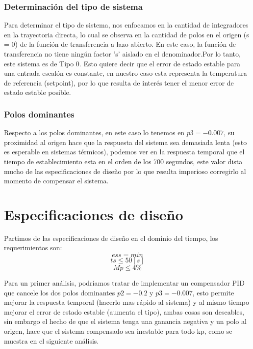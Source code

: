 \documentclass[12pt]{article}
\begin{document}
	\subsubsection{Determinación del tipo de sistema}
	Para determinar el tipo de sistema, nos enfocamos en la cantidad de integradores en la trayectoria directa, lo cual se observa en la cantidad de polos en el origen (s = 0) de la función de transferencia a lazo abierto.	En este caso, la función de transferencia no tiene ningún factor 's' aislado en el denominador.Por lo tanto, este sistema es de Tipo 0. Esto quiere decir que el error de estado estable para una entrada escalón es constante, en nuestro caso esta representa la temperatura de referencia (setpoint), por lo que resulta de interés tener el menor error de estado estable posible.

	\subsubsection{Polos dominantes}
	Respecto a los polos dominantes, en este caso lo tenemos en $p3=-0.007$, su proximidad al origen hace que la respuesta del sistema sea demasiada lenta (esto es esperable en sistemas térmicos), podemos ver en la respuesta temporal que el tiempo de establecimiento esta en el orden de los 700 segundos, este valor dista mucho de las especificaciones de diseño por lo que resulta imperioso corregirlo al momento de compensar el sistema.\newpage
	
\section{Especificaciones de diseño}
	Partimos de las especificaciones de diseño en el dominio del tiempo, los requerimientos son:
	\begin{equation}
		ess=min
	\end{equation}
	\begin{equation}
		ts\leq 50[s]
	\end{equation}
	\begin{equation}
		Mp\leq 4 \%
	\end{equation}
	
	Para un primer análisis, podríamos tratar de implementar un compensador PID que cancele los dos polos dominantes $p2=-0.2$ y $p3=-0.007$, esto permite mejorar la respuesta temporal (hacerlo mas rápido al sistema) y al mismo tiempo mejorar el error de estado estable (aumenta el tipo), ambas cosas son deseables, sin embargo el hecho de que el sistema tenga una ganancia negativa y un polo al origen, hace que el sistema compensado sea inestable para todo kp, como se muestra en el siguiente análisis.
	
\end{document}
